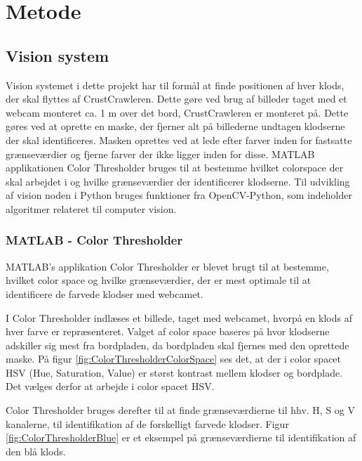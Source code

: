 \chapter{Metode}\label{chap:Metode}

\section{Vision system}
Vision systemet i dette projekt har til formål at finde positionen af hver klods, der skal flyttes af CrustCrawleren.
Dette gøre ved brug af billeder taget med et webcam monteret ca. 1 m over det bord, CrustCrawleren er monteret på.
Dette gøres ved at oprette en maske, der fjerner alt på billederne undtagen klodserne der skal identificeres.
Masken oprettes ved at lede efter farver inden for fastsatte grænseværdier og fjerne farver der ikke ligger inden for disse.
MATLAB applikationen Color Thresholder bruges til at bestemme hvilket colorspace der skal arbejdet i og hvilke grænseværdier der identificerer klodserne.
Til udvikling af vision noden i Python bruges funktioner fra OpenCV-Python, som indeholder algoritmer relateret til computer vision.

\subsection{MATLAB - Color Thresholder}
MATLAB's  applikation Color Thresholder er blevet brugt til at bestemme, hvilket color space og hvilke grænseværdier, der er mest optimale til at identificere de farvede klodser med webcamet.

I Color Thresholder indlæses et billede, taget med webcamet, hvorpå en klods af hver farve er repræsenteret.
Valget af color space baseres på hvor klodserne adskiller sig mest fra bordpladen, da bordpladen skal fjernes med den oprettede maske.
På figur \vref{fig:ColorThresholderColorSpace} ses det, at der i color spacet HSV (Hue, Saturation, Value) er størst kontrast mellem klodser og bordplade.
Det vælges derfor at arbejde i color spacet HSV.


Color Thresholder bruges derefter til at finde grænseværdierne til hhv. H, S og V kanalerne, til identifikation af de forskelligt farvede klodser.
Figur \vref{fig:ColorThresholderBlue} er et eksempel på grænseværdierne til identifikation af den blå klods.

